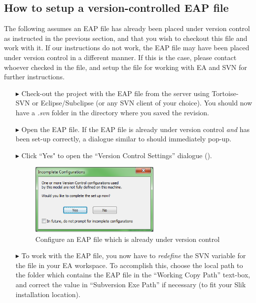 \subsection{How to setup a version-controlled EAP file}

The following assumes an EAP file has already been placed under version control as instructed in the previous section, and that you wish to checkout this file
and work with it. If our instructions do not work, the EAP file may have been placed under version control in a different manner. If this is the case, please
contact whoever checked in the file, and setup the file for working with EA and SVN for further instructions.

\begin{enumerate}

\item[$\blacktriangleright$] Check-out the project with the EAP file from the server using Tortoise-SVN or Eclipse/Subclipse (or any SVN client of your
choice). You should now have a \textit{.svn} folder in the directory where you saved the revision.

\item[$\blacktriangleright$] Open the EAP file. If the EAP file is already under version control \emph{and} has been set-up correctly, a dialogue similar to
 should immediately pop-up.

\item[$\blacktriangleright$] Click ``Yes" to open the ``Version Control Settings'' dialogue ().

\begin{figure}[!htbp]
\begin{center}
	\includegraphics[width=0.6\textwidth]{011}
	\caption{Configure an EAP file which is already under version control}
  	\label{fig:advanced-topics-eaSVN-incompleteConf}
\end{center}
\end{figure}

   \item[$\blacktriangleright$] To work with the EAP file, you now have to \emph{redefine} the SVN variable for the file in your EA workspace.
   To accomplish this, choose the local path to the folder which contains the EAP file in the ``Working Copy Path'' text-box, and correct the value in
   ``Subversion Exe Path'' if necessary (to fit your Slik installation location).


\end{enumerate}
